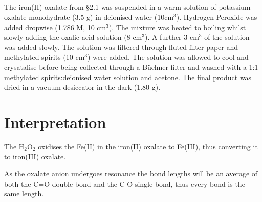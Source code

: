 \documentclass{article}
\begin{document}
\subsection{}

The iron(II) oxalate from \S 2.1 was suspended in a warm solution of potassium oxalate monohydrate
(3.5 g) in deionised water (10cm$^3$). Hydrogen Peroxide was added dropwise (1.786 M, 10 cm$^3$).
The mixture was heated to boiling whilst slowly adding the oxalic acid solution (8 cm$^3$). A
further 3 cm$^3$ of the solution was added slowly. The solution was filtered through fluted
filter paper and methylated spirits (10 cm$^3$) were added. The solution was allowed to cool
and crysatalise before being collected through a Büchner filter and washed with a 1:1 methylated
spirits:deionised water solution and acetone. The final product was  dried in a vacuum desiccator
in the dark (1.80 g).

\newpage
\section{Interpretation}

\begin{questions}

    The H$_2$O$_2$ oxidises the Fe(II) in the iron(II) oxalate to Fe(III), thus converting it
    to iron(III) oxalate.\\


    As the oxalate anion undergoes resonance the bond lengths will be an average of both the
    C=O double bond and the C-O single bond, thus every bond is the same length.
\end{questions}
\end{document}

